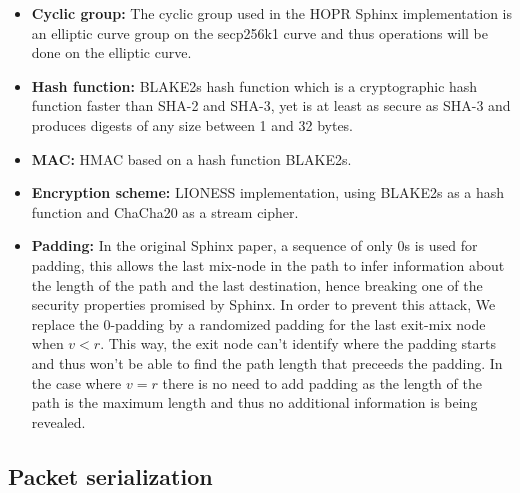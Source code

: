 \begin{itemize}
    \item \textbf{Cyclic group:} The cyclic group used in the HOPR Sphinx
        implementation is an elliptic curve group on the secp256k1 curve and
        thus operations will be done on the elliptic curve.

    \item \textbf{Hash function:} BLAKE2s hash function which is a cryptographic
        hash function faster than SHA-2 and SHA-3, yet is at least as secure as
        SHA-3 and produces digests of any size between 1 and 32 bytes.

    \item \textbf{MAC:} HMAC based on a hash function BLAKE2s.

    \item \textbf{Encryption scheme:} LIONESS \cite{lionesspaper}
        implementation, using BLAKE2s as a hash function and ChaCha20 as a
        stream cipher.

    \item \textbf{Padding:} In the original Sphinx paper, a sequence of only 0s
        is used for padding, this allows the last mix-node in the path to infer
        information about the length of the path and the last destination, hence
        breaking one of the security properties promised by Sphinx. In order to
        prevent this attack, We replace the 0-padding by a randomized padding
        for the last exit-mix node when $v<r$. This way, the exit node can't
        identify where the padding starts and thus won't be able to find the
        path length that preceeds the padding. In the case where $v=r$ there is
        no need to add padding as the length of the path is the maximum length
        and thus no additional information is being revealed.

\end{itemize}

\subsection{Packet serialization}
